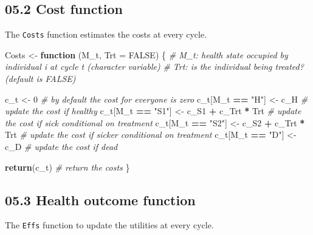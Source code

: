 \documentclass[
]{article}
\newenvironment{Shaded}{\begin{snugshade}}{\end{snugshade}}
\newcommand{\CommentTok}[1]{\textcolor[rgb]{0.56,0.35,0.01}{\textit{#1}}}
\newcommand{\ControlFlowTok}[1]{\textcolor[rgb]{0.13,0.29,0.53}{\textbf{#1}}}
\newcommand{\DataTypeTok}[1]{\textcolor[rgb]{0.13,0.29,0.53}{#1}}
\newcommand{\DecValTok}[1]{\textcolor[rgb]{0.00,0.00,0.81}{#1}}
\newcommand{\KeywordTok}[1]{\textcolor[rgb]{0.13,0.29,0.53}{\textbf{#1}}}
\newcommand{\NormalTok}[1]{#1}
\newcommand{\OperatorTok}[1]{\textcolor[rgb]{0.81,0.36,0.00}{\textbf{#1}}}
\newcommand{\OtherTok}[1]{\textcolor[rgb]{0.56,0.35,0.01}{#1}}
\newcommand{\StringTok}[1]{\textcolor[rgb]{0.31,0.60,0.02}{#1}}
\begin{document}
\hypertarget{cost-function}{%
\subsection{05.2 Cost function}\label{cost-function}}

The \texttt{Costs} function estimates the costs at every cycle.

\begin{Shaded}
\begin{Highlighting}[]
\NormalTok{Costs <-}\StringTok{ }\ControlFlowTok{function}\NormalTok{ (M_t, }\DataTypeTok{Trt =} \OtherTok{FALSE}\NormalTok{) \{}
  \CommentTok{# M_t: health state occupied by individual i at cycle t (character variable)}
  \CommentTok{# Trt:  is the individual being treated? (default is FALSE) }
  
\NormalTok{  c_t <-}\StringTok{ }\DecValTok{0}                                 \CommentTok{# by default the cost for everyone is zero }
\NormalTok{  c_t[M_t }\OperatorTok{==}\StringTok{ "H"}\NormalTok{]  <-}\StringTok{ }\NormalTok{c_H                  }\CommentTok{# update the cost if healthy}
\NormalTok{  c_t[M_t }\OperatorTok{==}\StringTok{ "S1"}\NormalTok{] <-}\StringTok{ }\NormalTok{c_S1 }\OperatorTok{+}\StringTok{ }\NormalTok{c_Trt }\OperatorTok{*}\StringTok{ }\NormalTok{Trt   }\CommentTok{# update the cost if sick conditional on treatment}
\NormalTok{  c_t[M_t }\OperatorTok{==}\StringTok{ "S2"}\NormalTok{] <-}\StringTok{ }\NormalTok{c_S2 }\OperatorTok{+}\StringTok{ }\NormalTok{c_Trt }\OperatorTok{*}\StringTok{ }\NormalTok{Trt   }\CommentTok{# update the cost if sicker conditional on treatment}
\NormalTok{  c_t[M_t }\OperatorTok{==}\StringTok{ "D"}\NormalTok{]  <-}\StringTok{ }\NormalTok{c_D                  }\CommentTok{# update the cost if dead}
  
  \KeywordTok{return}\NormalTok{(c_t)                                  }\CommentTok{# return the costs}
\NormalTok{\}}
\end{Highlighting}
\end{Shaded}

\hypertarget{health-outcome-function}{%
\subsection{05.3 Health outcome
function}\label{health-outcome-function}}

The \texttt{Effs} function to update the utilities at every cycle.
\end{document}
